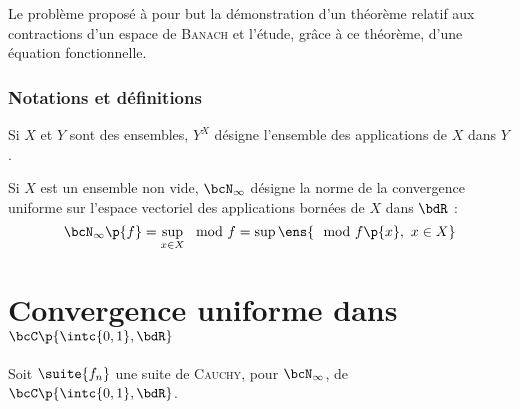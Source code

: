 \documentclass[a4paper,french,bookmarks]{article}
\begin{document}
    \renewcommand{\thesection}{\Roman{section}}
    \renewcommand{\thesection}{\Roman{section}}
    \renewcommand{\labelenumi}{\Roman{section}.\arabic{enumi}.}
    \renewcommand*{\labelenumii}{\Roman{section}.\arabic{enumi}.\arabic{enumii}.}

    
    Le problème proposé à pour but la démonstration d'un théorème relatif aux contractions d'un espace de \textsc{Banach} et l'étude, grâce à ce théorème, d'une équation fonctionnelle.
    
    \subsubsection*{Notations et définitions}
    
    \begin{enumerate}
        \itt Si $X$ et $Y$ sont des ensembles, $Y^X$ désigne l'ensemble des applications de $X$ dans $Y$.
        
        \itt Si $X$ est un ensemble non vide, $\bcN_\infty$ désigne la norme de la convergence uniforme sur l'espace vectoriel des applications bornées de $X$ dans $\bdR$ :
        \[ \bcN_\infty\p{f} = \sup\limits_{x \in X} \mod{f} = \sup\limits \ens{\mod{f\p{x}},\ x \in X}\]
    \end{enumerate}
    
    \section{Convergence uniforme dans $\bcC\p{\intc{0, 1}, \bdR}$}
    
    Soit $\suite{f_n}$ une suite de \textsc{Cauchy}, pour $\bcN_\infty$, de $\bcC\p{\intc{0, 1}, \bdR}$.
    
\end{document}
